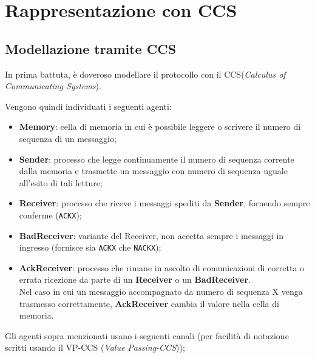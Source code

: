 \newpage{}\section{Rappresentazione con CCS}

\subsection{Modellazione tramite CCS}

In prima battuta, è doveroso modellare il protocollo con il CCS(\emph{Calculus
of Communicating Systems}).

Vengono quindi individuati i seguenti agenti:

\begin{itemize}
\item \textbf{Memory}: cella di memoria in cui è possibile leggere o scrivere
  il numero di sequenza di un messaggio;
\item \textbf{Sender}: processo che legge continuamente il numero di sequenza
  corrente dalla memoria e trasmette un messaggio con numero di sequenza
  uguale all'esito di tali letture;
\item \textbf{Receiver}: processo che riceve i messaggi spediti da
  \textbf{Sender}, fornendo sempre conferme (\texttt{ACKX});
\item \textbf{BadReceiver}: variante del Receiver, non accetta sempre i
  messaggi in ingresso (fornisce sia \texttt{ACKX} che \texttt{NACKX});
\item \textbf{AckReceiver}: processo che rimane in ascolto di comunicazioni di
  corretta o errata ricezione da parte di un \textbf{Receiver} o un
  \textbf{BadReceiver}. \\
  Nel caso in cui un messaggio accompagnato da numero di sequenza X venga
  trasmesso correttamente, \textbf{AckReceiver} cambia il valore nella cella
  di memoria.
\end{itemize}

Gli agenti sopra menzionati usano i seguenti canali (per facilità di notazione
scritti usando il VP-CCS (\emph{Value Passing-CCS}));

